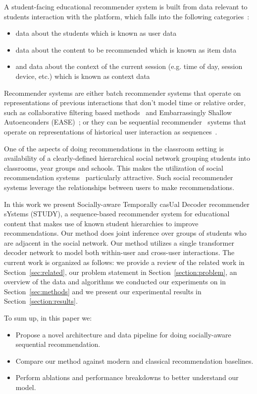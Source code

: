 \documentclass{article}
\begin{document}
A student-facing educational recommender system is built from data relevant to students interaction with the platform, which falls into the following categories~\cite{fang2020deep}:
\begin{itemize}
    \item data about the students which is known as user data
    \item data about the content to be recommended which is known as item data
    \item and data about the context of the current session (e.g. time of day, session device, etc.) which is known as context data
\end{itemize}

Recommender systems are either batch recommender systems that operate on representations of previous interactions that don't model time or relative order, such as collaborative filtering based methods~\cite{su2009survey} and Embarrassingly Shallow Autoenconders (EASE)~\cite{steck2019embarrassingly}; or they can be sequential recommender~\cite{quadrana2018sequence} systems that operate on representations of historical user interaction as sequences~\cite{wang2021survey}.

One of the aspects of doing recommendations in the classroom setting is availability of a clearly-defined hierarchical social network grouping students into classrooms, year groups and schools. This makes the utilization of social recommendation systems~\cite{xia2023disentangled} particularly attractive. Such social recommender systems leverage the relationships between users to make recommendations.

In this work we present Socially-aware Temporally casUal Decoder recommender sYstems (STUDY), a sequence-based recommender system for educational content that makes use of known student hierarchies to improve recommendations. Our method does joint inference over groups of students who are adjacent in the social network. Our method utilizes a single transformer decoder network to model both within-user and cross-user interactions. The current work is organized as follows: we provide a review of the related work in Section~\ref{sec:related}, our problem statement in Section~\ref{section:problem}, an overview of the data and algorithms we conducted our experiments on in Section~\ref{sec:methods} and we present our experimental results in Section~\ref{section:results}.

To sum up, in this paper we:
\begin{itemize}
    \item Propose a novel architecture and data pipeline for doing socially-aware sequential recommendation.
    \item Compare our method against modern and classical recommendation baselines.
    \item Perform ablations and performance breakdowns to better understand our model.
\end{itemize}
 
\end{document}
